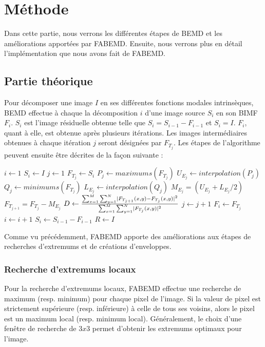 \chapter{Méthode}
Dans cette partie, nous verrons les différentes étapes de BEMD et les améliorations apportées par FABEMD. Ensuite, nous verrons plus en détail l'implémentation que nous avons fait de FABEMD.

\section{Partie théorique}
Pour décomposer une image $I$ en ses différentes fonctions modales intrinsèques, BEMD effectue à chaque la décomposition $i$ d'une image source $S_i$ en son BIMF $F_i$. $S_i$ est l'image résiduelle obtenue telle que $S_i = S_{i-1}-F_{i-1}$ et $S_i = I$.
$F_i$, quant à elle, est obtenue après plusieurs itérations. Les images intermédiaires obtenues à chaque itération $j$ seront désignées par $F_{T_j}$. Les étapes de l'algorithme peuvent ensuite être décrites de la façon suivante :

\begin{algorithmic}
\State $i \gets 1$
\State $S_i \gets I$
\Repeat
	\State $j \gets 1$
	\State $F_{T_j} \gets S_i$
	\Repeat
		\State $P_j \gets maximums(F_{T_j})$
		\State $U_{E_j} \gets interpolation(P_j)$
		\State $Q_j \gets minimums(F_{T_j})$
		\State $L_{E_j} \gets interpolation(Q_j)$
		\State $M_{E_j} = (U_{E_j} + L_{E_j} / 2)$
		\State $F_{T_{j+1}} = F_{T_j} - M_{E_j}$
		\State $D \gets {\sum_{x=1}^{M} \sum_{y=1}^{N} \mid F_{T_{j+1}}(x,y) - F_{T_j}(x,y) \mid^{2} \over \sum_{x=1}^{M}  \sum_{y=1}^{N} \mid F_{T_j}(x,y) \mid^{2}}$
		\State $j \gets j+1$
	\State $F_i \gets F_{T_j}$
	\State $i \gets i + 1$
	\State $S_i \gets S_{i-1} - F_{i-1}$
\State $R \gets I$
\end{algorithmic}

Comme vu précédemment, FABEMD apporte des améliorations aux étapes de recherches d'extremums et de créations d'enveloppes.
\subsection{Recherche d'extremums locaux}
Pour la recherche d'extremums locaux, FABEMD effectue une recherche de maximum (resp. minimum) pour chaque pixel de l'image. Si la valeur de pixel est strictement supérieure (resp. inférieure) à celle de tous ses voisins, alors le pixel est un maximum local (resp. minimum local). Généralement, le choix d'une fenêtre de recherche de $3x3$ permet d'obtenir les extremums optimaux pour l'image.

